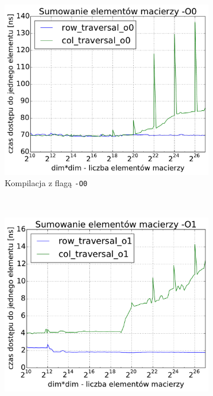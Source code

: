 \begin{figure}[!h]
    \centering
    \begin{subfigure}[c]{0.45\textwidth}
        \centering
        \includegraphics[width=\textwidth]{images/benchs_xeon/matrix_sum_O0}
        \caption{Kompilacja z flagą \texttt{-O0}}
    \end{subfigure}
    ~
    \begin{subfigure}[c]{0.45\textwidth}
        \centering
        \includegraphics[width=\textwidth]{images/benchs_xeon/matrix_sum_O1}

\end{subfigure}
\end{figure}
